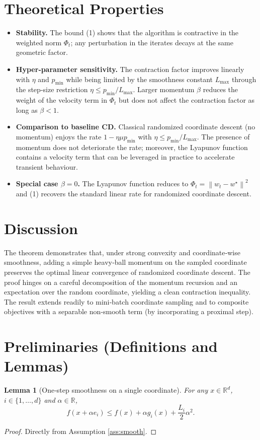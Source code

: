 \documentclass{article}
\newtheorem{lemma}{Lemma}
\newcommand{\R}{\mathbb{R}}
\newcommand{\norm}[1]{\left\|#1\right\|}
\begin{document}
\section*{Theoretical Properties}
\begin{itemize}[noitemsep]
\item \textbf{Stability.} The bound (1) shows that the algorithm is contractive in the weighted norm $\Phi_t$; any perturbation in the iterates decays at the same geometric factor.
\item \textbf{Hyper‑parameter sensitivity.} The contraction factor improves linearly with $\eta$ and $p_{\min}$ while being limited by the smoothness constant $L_{\max}$ through the step‑size restriction $\eta\le p_{\min}/L_{\max}$. Larger momentum $\beta$ reduces the weight of the velocity term in $\Phi_t$ but does not affect the contraction factor as long as $\beta<1$.
\item \textbf{Comparison to baseline CD.} Classical randomized coordinate descent (no momentum) enjoys the rate $1-\eta\mu p_{\min}$ with $\eta\le p_{\min}/L_{\max}$. The presence of momentum does not deteriorate the rate; moreover, the Lyapunov function contains a velocity term that can be leveraged in practice to accelerate transient behaviour.
\item \textbf{Special case $\beta=0$.} The Lyapunov function reduces to $\Phi_t=\norm{w_t-w^{\star}}^{2}$ and (1) recovers the standard linear rate for randomized coordinate descent.
\end{itemize}

\section*{Discussion}
The theorem demonstrates that, under strong convexity and coordinate‑wise smoothness, adding a simple heavy‑ball momentum on the sampled coordinate preserves the optimal linear convergence of randomized coordinate descent. The proof hinges on a careful decomposition of the momentum recursion and an expectation over the random coordinate, yielding a clean contraction inequality. The result extends readily to mini‑batch coordinate sampling and to composite objectives with a separable non‑smooth term (by incorporating a proximal step).

\newpage

\section*{Preliminaries (Definitions and Lemmas)}
\begin{lemma}[One‑step smoothness on a single coordinate]\label{lem:smooth}
For any $x\in\R^{d}$, $i\in\{1,\dots,d\}$ and $\alpha\in\R$,
\[
f(x+\alpha e_i)\le f(x)+\alpha g_i(x)+\frac{L_i}{2}\alpha^{2}.
\]
\end{lemma}
\begin{proof}
Directly from Assumption \ref{ass:smooth}. \hfill\qedsymbol
\end{proof}
\end{document}
